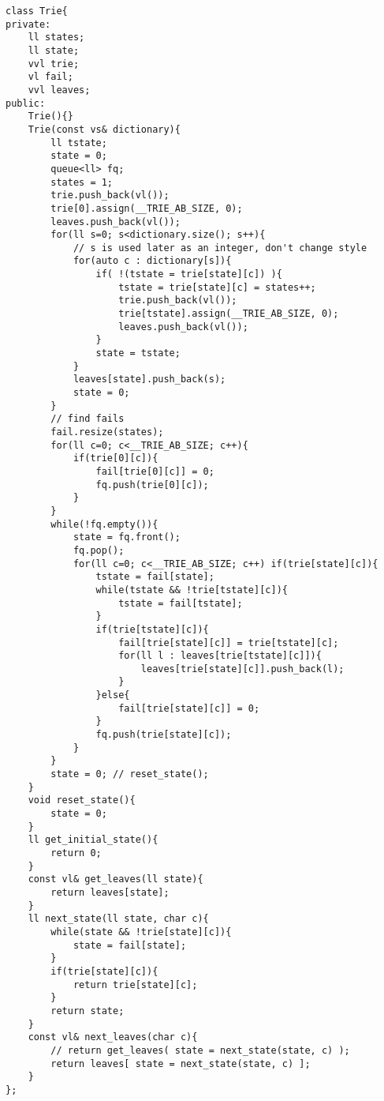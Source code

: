 \documentclass[a4paper,landscape,8pt]{extarticle}
\begin{document}
\begin{multicols}{3}
\begin{lstlisting}
class Trie{
private:
    ll states;
    ll state;
    vvl trie;
    vl fail;
    vvl leaves;
public:
    Trie(){}
    Trie(const vs& dictionary){
        ll tstate;
        state = 0;
        queue<ll> fq;
        states = 1;
        trie.push_back(vl());
        trie[0].assign(__TRIE_AB_SIZE, 0);
        leaves.push_back(vl());
        for(ll s=0; s<dictionary.size(); s++){
            // s is used later as an integer, don't change style
            for(auto c : dictionary[s]){
                if( !(tstate = trie[state][c]) ){
                    tstate = trie[state][c] = states++;
                    trie.push_back(vl());
                    trie[tstate].assign(__TRIE_AB_SIZE, 0);
                    leaves.push_back(vl());
                }
                state = tstate;
            }
            leaves[state].push_back(s);
            state = 0;
        }
        // find fails
        fail.resize(states);
        for(ll c=0; c<__TRIE_AB_SIZE; c++){
            if(trie[0][c]){
                fail[trie[0][c]] = 0;
                fq.push(trie[0][c]);
            }
        }
        while(!fq.empty()){
            state = fq.front();
            fq.pop();
            for(ll c=0; c<__TRIE_AB_SIZE; c++) if(trie[state][c]){
                tstate = fail[state];
                while(tstate && !trie[tstate][c]){
                    tstate = fail[tstate];
                }
                if(trie[tstate][c]){
                    fail[trie[state][c]] = trie[tstate][c];
                    for(ll l : leaves[trie[tstate][c]]){
                        leaves[trie[state][c]].push_back(l);
                    }
                }else{
                    fail[trie[state][c]] = 0;
                }
                fq.push(trie[state][c]);
            }
        }
        state = 0; // reset_state();
    }
    void reset_state(){
        state = 0;
    }
    ll get_initial_state(){
        return 0;
    }
    const vl& get_leaves(ll state){
        return leaves[state];
    }
    ll next_state(ll state, char c){
        while(state && !trie[state][c]){
            state = fail[state];
        }
        if(trie[state][c]){
            return trie[state][c];
        }
        return state;
    }
    const vl& next_leaves(char c){
        // return get_leaves( state = next_state(state, c) );
        return leaves[ state = next_state(state, c) ];
    }
};
\end{lstlisting}

\end{multicols}
\end{document}
